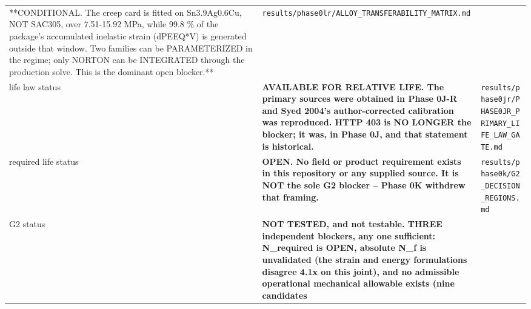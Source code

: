 \documentclass[10pt,]{article}
\begin{document}
\begin{longtable}[]{@{}lll@{}}
\begin{minipage}[t]{0.30\columnwidth}
**CONDITIONAL. The creep card is fitted on Sn3.9Ag0.6Cu, NOT SAC305,
over 7.51-15.92 MPa, while 99.8 \% of the package's accumulated
inelastic strain (dPEEQ*V) is generated outside that window. Two
families can be PARAMETERIZED in the regime; only NORTON can be
INTEGRATED through the production solve. This is the dominant open
blocker.**\strut
\end{minipage} & \begin{minipage}[t]{0.30\columnwidth}\raggedright
\texttt{results/phase0lr/ALLOY\_TRANSFERABILITY\_MATRIX.md}\strut
\end{minipage}\tabularnewline
\begin{minipage}[t]{0.30\columnwidth}\raggedright
life law status\strut
\end{minipage} & \begin{minipage}[t]{0.30\columnwidth}\raggedright
\textbf{AVAILABLE FOR RELATIVE LIFE. The primary sources were obtained
in Phase 0J-R and Syed 2004's author-corrected calibration was
reproduced. HTTP 403 is NO LONGER the blocker; it was, in Phase 0J, and
that statement is historical.}\strut
\end{minipage} & \begin{minipage}[t]{0.30\columnwidth}\raggedright
\texttt{results/phase0jr/PHASE0JR\_PRIMARY\_LIFE\_LAW\_GATE.md}\strut
\end{minipage}\tabularnewline
\begin{minipage}[t]{0.30\columnwidth}\raggedright
required life status\strut
\end{minipage} & \begin{minipage}[t]{0.30\columnwidth}\raggedright
\textbf{OPEN. No field or product requirement exists in this repository
or any supplied source. It is NOT the sole G2 blocker -- Phase 0K
withdrew that framing.}\strut
\end{minipage} & \begin{minipage}[t]{0.30\columnwidth}\raggedright
\texttt{results/phase0k/G2\_DECISION\_REGIONS.md}\strut
\end{minipage}\tabularnewline
\begin{minipage}[t]{0.30\columnwidth}\raggedright
G2 status\strut
\end{minipage} & \begin{minipage}[t]{0.30\columnwidth}\raggedright
\textbf{NOT TESTED, and not testable. THREE independent blockers, any
one sufficient: N\_required is OPEN, absolute N\_f is unvalidated (the
strain and energy formulations disagree 4.1x on this joint), and no
admissible operational mechanical allowable exists (nine candidates
}
\end{minipage}
\end{longtable}
\end{document}
